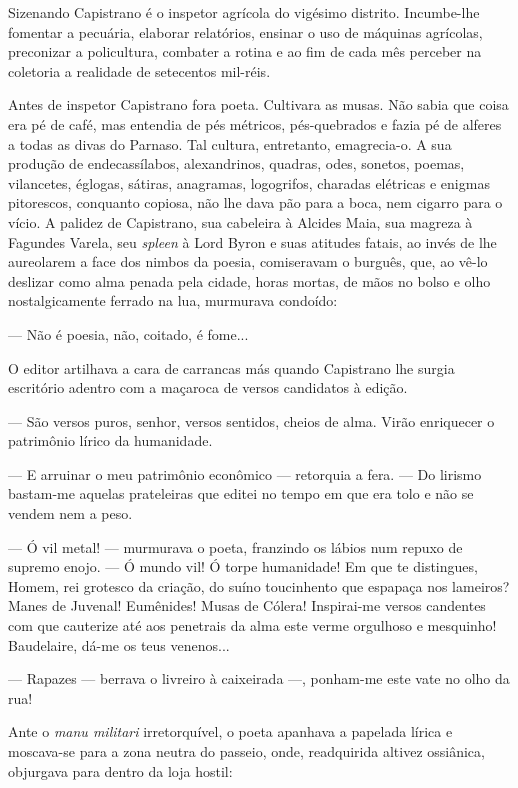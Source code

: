 Sizenando Capistrano é o inspetor agrícola do vigésimo distrito.
Incumbe-lhe fomentar a pecuária, elaborar relatórios, ensinar o uso de
máquinas agrícolas, preconizar a policultura, combater a rotina e ao fim
de cada mês perceber na coletoria a realidade de setecentos mil-réis.

Antes de inspetor Capistrano fora poeta. Cultivara as musas. Não sabia
que coisa era pé de café, mas entendia de pés métricos, pés-quebrados e
fazia pé de alferes a todas as divas do Parnaso. Tal cultura,
entretanto, emagrecia-o. A sua produção de endecassílabos, alexandrinos,
quadras, odes, sonetos, poemas, vilancetes, églogas, sátiras, anagramas,
logogrifos, charadas elétricas e enigmas pitorescos, conquanto copiosa,
não lhe dava pão para a boca, nem cigarro para o vício. A palidez de
Capistrano, sua cabeleira à Alcides Maia, sua magreza à Fagundes Varela,
seu \emph{spleen} à Lord Byron e suas atitudes fatais, ao invés de lhe
aureolarem a face dos nimbos da poesia, comiseravam o burguês, que, ao
vê-lo deslizar como alma penada pela cidade, horas mortas, de mãos no
bolso e olho nostalgicamente ferrado na lua, murmurava condoído:

--- Não é poesia, não, coitado, é fome...

O editor artilhava a cara de carrancas más quando Capistrano lhe surgia
escritório adentro com a maçaroca de versos candidatos à edição.

--- São versos puros, senhor, versos sentidos, cheios de alma. Virão
enriquecer o patrimônio lírico da humanidade.

--- E arruinar o meu patrimônio econômico --- retorquia a fera. --- Do
lirismo bastam-me aquelas prateleiras que editei no tempo em que era
tolo e não se vendem nem a peso.

--- Ó vil metal! --- murmurava o poeta, franzindo os lábios num repuxo
de supremo enojo. --- Ó mundo vil! Ó torpe humanidade! Em que te
distingues, Homem, rei grotesco da criação, do suíno toucinhento que
espapaça nos lameiros? Manes de Juvenal! Eumênides! Musas de Cólera!
Inspirai-me versos candentes com que cauterize até aos penetrais da alma
este verme orgulhoso e mesquinho! Baudelaire, dá-me os teus venenos...

--- Rapazes --- berrava o livreiro à caixeirada ---, ponham-me este vate
no olho da rua!

Ante o \emph{manu militari} irretorquível, o poeta apanhava a papelada
lírica e moscava-se para a zona neutra do passeio, onde, readquirida
altivez ossiânica, objurgava para dentro da loja hostil:

